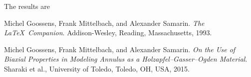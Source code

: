 \documentclass[12pt]{article}
\begin{document}
The results are 


\pagebreak
\begin{thebibliography}{9}
  Michel Goossens, Frank Mittelbach, and Alexander Samarin. 
  \textit{The \LaTeX\ Companion}. 
  Addison-Wesley, Reading, Massachusetts, 1993.

  Michel Goossens, Frank Mittelbach, and Alexander Samarin. 
  \textit{On the Use of Biaxial Properties in Modeling Annulus as a Holzapfel–Gasser–Ogden Material}. 
  Sharaki et al., University of Toledo, Toledo, OH, USA, 2015.

\end{thebibliography}
\end{document}
